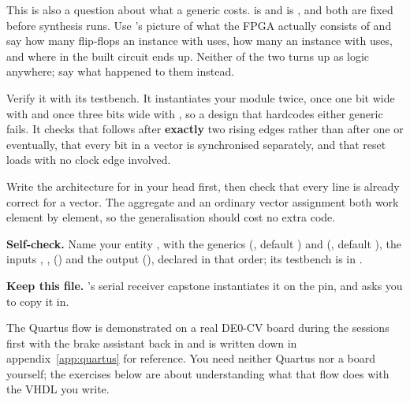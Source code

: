  This is also a question about what a generic costs.  is
 and  is , and both are fixed before
synthesis runs. Use 's picture of what the FPGA actually consists of and say
how many flip-flops an instance with  uses, how many an instance with
 uses, and where in the built circuit  ends up. Neither of the two turns
up as logic anywhere; say what happened to them instead.

 Verify it with its testbench. It instantiates your module twice, once one bit wide with
 and once three bits wide with , so a design that hardcodes
either generic fails. It checks that  follows  after \textbf{exactly}
two rising edges rather than after one or eventually, that every bit in a vector is synchronised
separately, and that reset loads  with no clock edge involved.

\note[Hint]Write the architecture for  in your head first, then check that every line
is already correct for a vector. The aggregate  and an ordinary vector
assignment both work element by element, so the generalisation should cost no extra code.


\begin{selfcheck}
\textbf{Self-check.} Name your entity , with the generics 
(, default ) and  (, default
), the inputs , , 
() and the output 
(), declared in that order; its testbench is in
.

\textbf{Keep this file.} 's serial receiver capstone instantiates it on the 
pin, and asks you to copy it in.
\end{selfcheck}


The Quartus flow is demonstrated on a real DE0-CV board during the sessions \textemdash{} first with
the brake assistant back in  \textemdash{} and is written down in
appendix~\ref{app:quartus} for reference. You need neither Quartus nor a board yourself; the
exercises below are about understanding what that flow does with the VHDL you write.

